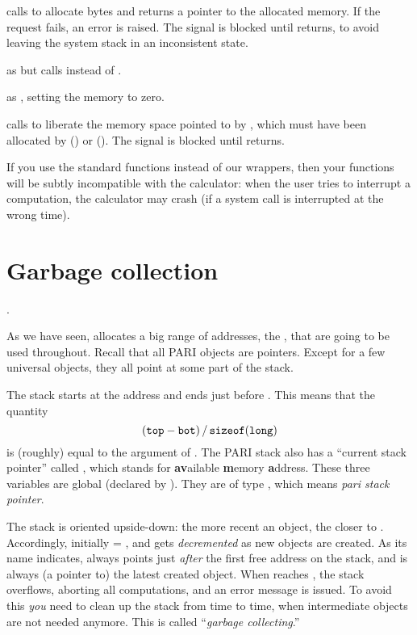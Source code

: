  calls  to allocate
 bytes and returns a pointer to the allocated memory. If the
request fails, an error is raised. The  signal is blocked until
 returns, to avoid leaving the system stack in an inconsistent
state.

 as  but calls
 instead of .

 as , setting the
memory to zero.

 calls  to liberate the memory space
pointed to by , which must have been allocated by 
() or  (). The  signal
is blocked until  returns.

If you use the standard  functions instead of our wrappers, then
your functions will be subtly incompatible with the  calculator: when
the user tries to interrupt a computation, the calculator may crash
(if a system call is interrupted at the wrong time).

\section{Garbage collection}\label{se:garbage}

.

\noindent
As we have seen,  allocates a big range of
addresses, the , that are going to be used throughout. Recall
that all PARI objects are pointers. Except for a few universal objects,
they all point at some part of the stack.

The stack starts at the address  and ends just before . This
means that the quantity
%
$$ ({\tt top} - {\tt bot})\,/\,{\tt sizeof(long)} $$
%
is (roughly) equal to the  argument of . The PARI
stack also has a ``current stack pointer'' called , which stands
for {\bf av}ailable {\bf m}emory {\bf a}ddress. These three variables are
global (declared by ). They are of type , which
means \emph{pari stack pointer}.

The stack is oriented upside-down: the more recent an object, the closer to
. Accordingly, initially  = , and  gets
\emph{decremented} as new objects are created. As its name indicates,
 always points just \emph{after} the first free address on the
stack, and  is always (a pointer to) the latest created object.
When  reaches , the stack overflows, aborting all
computations, and an error message is issued. To avoid this \emph{you}
need to clean up the stack from time to time, when intermediate objects are
not needed anymore. This is called ``\emph{garbage collecting}.''

